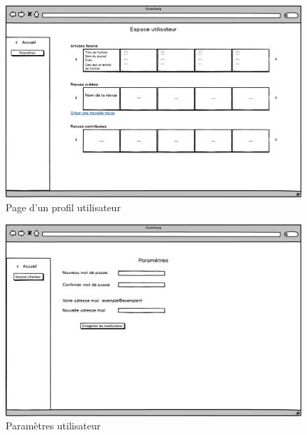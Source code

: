     \begin{figure}[H]
        \centering
        \includegraphics[width=\textwidth]{figures/Utilisateur.png}
            \caption{Page d'un profil utilisateur}
            \label{fig:utilisateur}
    \end{figure}

    \begin{figure}[H]
        \centering
        \includegraphics[width=\textwidth]{figures/Parametre.png}
            \caption{Paramètres utilisateur}
            \label{fig:utilisateur}
    \end{figure}